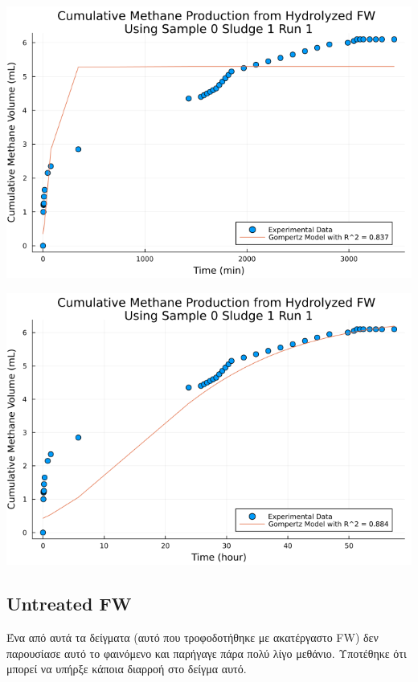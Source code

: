 \documentclass[11pt]{article}
\begin{document}
\begin{center}
\includegraphics[width=.9\linewidth]{../plots/BMPs/Hydrolyzed FW/methane_kinetics_hydrolysate_0_s1_r1_min.png}
\end{center}

\begin{center}
\includegraphics[width=.9\linewidth]{../plots/BMPs/Hydrolyzed FW/methane_kinetics_hydrolysate_0_s1_r1_hour.png}
\end{center}

\subsection{Untreated FW}
\label{sec:org74e295c}
Ένα από αυτά τα δείγματα (αυτό που τροφοδοτήθηκε με ακατέργαστο FW) δεν παρουσίασε αυτό το φαινόμενο και παρήγαγε πάρα πολύ λίγο μεθάνιο. Υποτέθηκε ότι μπορεί να υπήρξε κάποια διαρροή στο δείγμα αυτό.
\end{document}
